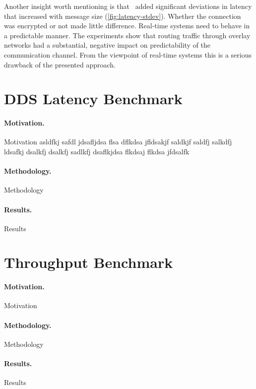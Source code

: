Another insight worth mentioning is that \wnet\ added significant deviations in latency that increased with message size (\cf \autoref{fig:latency-stdev}). Whether the connection was encrypted or not made little difference. Real-time systems need to behave in a predictable manner. The experiments show that routing traffic through overlay networks had a substantial, negative impact on predictability of the communication channel. From the viewpoint of real-time systems this is a serious drawback of the presented approach. 



%
%
%
%
%
%
%
%
%
%

\section{DDS Latency Benchmark}

\paragraph{Motivation.} Motivation asldfkj safdl jdsafljdsa flsa dflkdsa jfldsakjf saldkjf saldfj salkdfj ldsafkj dsalkfj dsalkfj sadlkfj dsaflkjdsa flkdsaj flkdsa jfdsalfk 

\paragraph{Methodology.} Methodology

\paragraph{Results.} Results

%
%
%
%
%
%
%
%
%
%

\section{Throughput Benchmark}

\paragraph{Motivation.} Motivation

\paragraph{Methodology.} Methodology

\paragraph{Results.} Results

